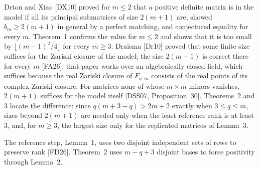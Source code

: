 \documentclass[11pt,letterpaper,reqno]{amsart}
\theoremstyle{spaced}
\begin{document}
Drton and Xiao {[}DX10{]} proved for \(m \le 2\) that a positive definite matrix is in the model if all its principal submatrices of size \(2(m+1)\) are, showed \(b_m \ge 2(m+1)\) in general by a perfect matching, and conjectured equality for every \(m\). Theorem~1 confirms the value for \(m \le 2\) and shows that it is too small by \(\lfloor (m-1)^2/4 \rfloor\) for every \(m \ge 3\). Draisma {[}Dr10{]} proved that some finite size suffices for the Zariski closure of the model; the size \(2(m+1)\) is correct there for every \(m\) {[}FA26{]}; that paper works over an algebraically closed field, which suffices because the real Zariski closure of \(F_{n,m}\) consists of the real points of its complex Zariski closure. For matrices none of whose \(m \times m\) minors vanishes, \(2(m+1)\) suffices for the model itself {[}DSS07, Proposition~30{]}. Theorems~2 and 3 locate the difference: since \(q(m+3-q) > 2m+2\) exactly when \(3 \le q \le m\), sizes beyond \(2(m+1)\) are needed only when the least reference rank is at least \(3\), and, for \(m \ge 3\), the largest size only for the replicated matrices of Lemma~3.

The reference step, Lemma~1, uses two disjoint independent sets of rows to preserve rank {[}FD26{]}. Theorem~2 uses \(m - q + 3\) disjoint bases to force positivity through Lemma~2.
\end{document}
